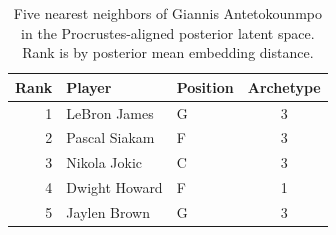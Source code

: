 \begin{table}[htbp]
  \centering\small
  \begin{tabular}{rllc}
    \toprule
    Rank & Player & Position & Archetype \\
    \midrule
    1 & LeBron James & G & 3 \\
    2 & Pascal Siakam & F & 3 \\
    3 & Nikola Jokic & C & 3 \\
    4 & Dwight Howard & F & 1 \\
    5 & Jaylen Brown & G & 3 \\
    \bottomrule
  \end{tabular}
  \caption{Five nearest neighbors of Giannis Antetokounmpo in the Procrustes-aligned posterior latent space. Rank is by posterior mean embedding distance.}
  \label{tab:Giannis_Antetokounmpo_neighbors}
\end{table}

